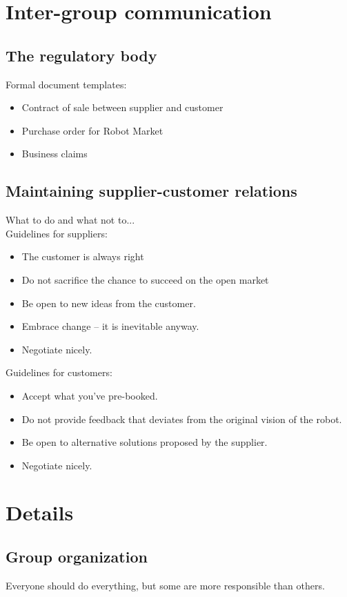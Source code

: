 \documentclass{scrreprt}
\begin{document}
\chapter{Inter-group communication}

\section{The regulatory body} \label{sec:regbody}
Formal document templates:

\begin{itemize}
\item Contract of sale between supplier and customer
\item Purchase order for Robot Market
\item Business claims
\end{itemize}

\section{Maintaining supplier-customer relations}
What to do and what not to...\\

Guidelines for suppliers:
\begin{itemize}
\item The customer is always right
\item Do not sacrifice the chance to succeed on the open market
\item Be open to new ideas from the customer.
\item Embrace change -- it is inevitable anyway.
\item Negotiate nicely.
\end{itemize}

Guidelines for customers:
\begin{itemize}
\item Accept what you've pre-booked.
\item Do not provide feedback that deviates from the original vision of the robot.
\item Be open to alternative solutions proposed by the supplier.
\item Negotiate nicely.
\end{itemize}

\chapter{Details}

\section{Group organization} \label{sec:roles}
Everyone should do everything, but some are more responsible than others.
\end{document}
